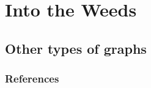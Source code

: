 \documentclass[
    11pt, %
    aspectratio=169, %
]{beamer}
\begin{document}
\section{Into the Weeds}

\subsection{Other types of graphs}
\begin{frame}{}
    
\end{frame}


\appendix
{}


\begin{frame} 
        \frametitle{References}

        \printbibliography
\end{frame}

\end{document}
